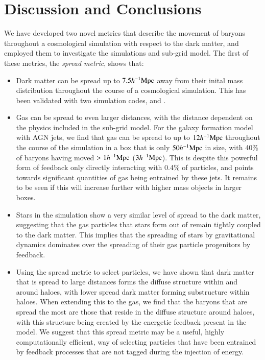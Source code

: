 \section{Discussion and Conclusions}
\label{sec:conclusions}

We have developed two novel metrics that describe the movement of baryons
throughout a cosmological simulation with respect to the dark matter, and
employed them to investigate the \simba{} simulations and sub-grid model.
The first of these metrics, the {\it spread metric}, shows that:
\begin{itemize}
    \item Dark matter can be spread up to $7.5h^{-1}{\rm Mpc}{}$ away from their inital
          mass distribution throughout the course of a cosmological simulation.
          This has been validated with two simulation codes, \gizmo{} and \swift{}.
    \item Gas can be spread to even larger distances, with the distance
          dependent on the physics included in the sub-grid model. For the
          \simba{} galaxy formation model with AGN jets, we find that gas can
          be spread to up to $12h^{-1}{\rm Mpc}{}$ throughout the course of the
          simulation in a box that is only $50h^{-1}{\rm Mpc}{}$ in size, with 40\% of
          baryons having moved $> 1h^{-1}{\rm Mpc}{}$ ($3h^{-1}{\rm Mpc}{}$). This is despite
          this powerful form of feedback only directly interacting with 0.4\%
          of particles, and points towards significant quantities of gas
          being entrained by these jets. It remains to be seen if this will
          increase further with higher mass objects in larger boxes.
    \item Stars in the simulation show a very similar level of spread to the
          dark matter, suggesting that the gas particles that stars form out
          of remain tightly coupled to the dark matter. This implies that the
          spreading of stars by gravitational dynamics dominates over the
          spreading of their gas particle progenitors by feedback.
    \item Using the spread metric to select particles, we have shown that
          dark matter that is spread to large distances forms the diffuse
          structure within and around haloes, with lower spread dark matter
          forming substructure within haloes. When extending this to the gas,
          we find that the baryons that are spread the most are those that
          reside in the diffuse structure around haloes, with this structure
          being created by the energetic feedback present in the \simba{}
          model. We suggest that this spread metric may be a useful, highly
          computationally efficient, way of selecting particles that have been
          entrained by feedback processes that are not tagged during the
          injection of energy.
\end{itemize}
